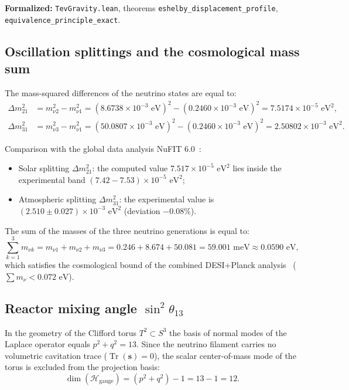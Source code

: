 \documentclass[11pt,a4paper]{article}
\theoremstyle{definition}
\theoremstyle{remark}
\begin{document}
\noindent\small\textbf{Formalized:} \texttt{TevGravity.lean}, theorems \texttt{eshelby_displacement_profile}, \texttt{equivalence_principle_exact}.


	
\subsection{Oscillation splittings and the cosmological mass sum}
	
The mass-squared differences of the neutrino states are equal to:
\begin{align}
	\Delta m_{21}^2 &= m_{\nu 2}^2 - m_{\nu 1}^2 = (8.6738 \times 10^{-3}\text{ eV})^2 - (0.2460 \times 10^{-3}\text{ eV})^2 = 7.5174 \times 10^{-5}\text{ eV}^2, \label{eq:dm21_sq_exact} \\
	\Delta m_{31}^2 &= m_{\nu 3}^2 - m_{\nu 1}^2 = (50.0807 \times 10^{-3}\text{ eV})^2 - (0.2460 \times 10^{-3}\text{ eV})^2 = 2.50802 \times 10^{-3}\text{ eV}^2. \label{eq:dm31_sq_exact}
\end{align}
	
Comparison with the global data analysis NuFIT 6.0~\cite{NuFIT60}:
\begin{itemize}
	\item Solar splitting $\Delta m_{21}^2$: the computed value $7.517 \times 10^{-5}\text{ eV}^2$ lies inside the experimental band $(7.42 - 7.53) \times 10^{-5}\text{ eV}^2$;
	\item Atmospheric splitting $\Delta m_{31}^2$: the experimental value is $(2.510 \pm 0.027) \times 10^{-3}\text{ eV}^2$ (deviation $-0.08\%$).
\end{itemize}
	
The sum of the masses of the three neutrino generations is equal to:
\begin{equation}
\sum_{k=1}^3 m_{\nu k} = m_{\nu 1} + m_{\nu 2} + m_{\nu 3} = 0.246 + 8.674 + 50.081 = 59.001\text{ meV} \approx 0.0590\text{ eV},
\label{eq:neutrino_sum_mass}
\end{equation}
which satisfies the cosmological bound of the combined DESI+Planck analysis~\cite{DESIPlanck2024} ($\sum m_\nu < 0.072\text{ eV}$).
	
\subsection{Reactor mixing angle $\sin^2\theta_{13}$}
	
In the geometry of the Clifford torus $T^2 \subset S^3$ the basis of normal modes of the Laplace operator equals $p^2 + q^2 = 13$.
Since the neutrino filament carries no volumetric cavitation trace ($\operatorname{Tr}(\mathbf{s}) = 0$), the scalar center-of-mass mode of the torus is excluded from the projection basis:
\begin{equation}
\dim(\mathcal{H}_{\mathrm{gauge}}) = (p^2 + q^2) - 1 = 13 - 1 = 12.
\label{eq:pmns_gauge_dim}
\end{equation}
	
\end{document}
